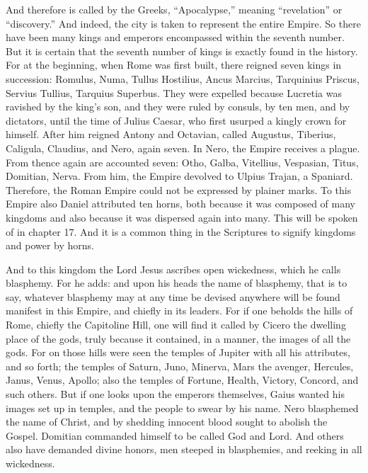 And therefore is called by the Greeks, “Apocalypse,” meaning “revelation” or “discovery.” And indeed, the city is taken to represent the entire Empire. So there have been many kings and emperors encompassed within the seventh number. But it is certain that the seventh number of kings is exactly found in the history. For at the beginning, when Rome was first built, there reigned seven kings in succession: Romulus, Numa, Tullus Hostilius, Ancus Marcius, Tarquinius Priscus, Servius Tullius, Tarquius Superbus. They were expelled because Lucretia was ravished by the king’s son, and they were ruled by consuls, by ten men, and by dictators, until the time of Julius Caesar, who first usurped a kingly crown for himself. After him reigned Antony and Octavian, called Augustus, Tiberius, Caligula, Claudius, and Nero, again seven. In Nero, the Empire receives a plague. From thence again are accounted seven: Otho, Galba, Vitellius, Vespasian, Titus, Domitian, Nerva. From him, the Empire devolved to Ulpius Trajan, a Spaniard. Therefore, the Roman Empire could not be expressed by plainer marks. To this Empire also Daniel attributed ten horns, both because it was composed of many kingdoms and also because it was dispersed again into many. This will be spoken of in chapter 17. And it is a common thing in the Scriptures to signify kingdoms and power by horns.

And to this kingdom the Lord Jesus ascribes open wickedness, which he calls blasphemy. For he adds: and upon his heads the name of blasphemy, that is to say, whatever blasphemy may at any time be devised anywhere will be found manifest in this Empire, and chiefly in its leaders. For if one beholds the hills of Rome, chiefly the Capitoline Hill, one will find it called by Cicero the dwelling place of the gods, truly because it contained, in a manner, the images of all the gods. For on those hills were seen the temples of Jupiter with all his attributes, and so forth; the temples of Saturn, Juno, Minerva, Mars the avenger, Hercules, Janus, Venus, Apollo; also the temples of Fortune, Health, Victory, Concord, and such others. But if one looks upon the emperors themselves, Gaius wanted his images set up in temples, and the people to swear by his name. Nero blasphemed the name of Christ, and by shedding innocent blood sought to abolish the Gospel. Domitian commanded himself to be called God and Lord. And others also have demanded divine honors, men steeped in blasphemies, and reeking in all wickedness.

